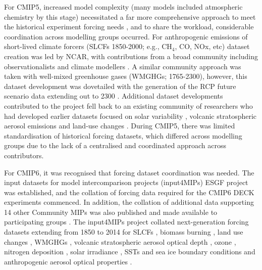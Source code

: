\documentclass[gmd, preprint]{copernicus}
\begin{document}
For CMIP5, increased model complexity (many models included atmospheric chemistry by this stage) necessitated a far more comprehensive approach to meet the historical experiment forcing needs \citep[1850-2005;][]{taylor_overview_2012}, and to share the workload, considerable coordination across modelling groups occurred. For anthropogenic emissions of short-lived climate forcers (SLCFs 1850-2000; e.g., CH$_{4}$, CO, NOx, etc) dataset creation was led by NCAR, with contributions from a broad community including observationalists and climate modellers \citep{lamarque_historical_2010}. A similar community approach was taken with well-mixed greenhouse gases (WMGHGs; 1765-2300), however, this dataset development was dovetailed with the generation of the RCP future scenario data extending out to 2300 \citep{meinshausen_rcp_2011}. Additional dataset developments contributed to the project fell back to an existing community of researchers who had developed earlier datasets focused on solar variability \citep{frohlich_solar_2004}, volcanic stratospheric aerosol emissions \citep{stenchikov_arctic_2006} and land-use changes \citep{hurtt_underpinnings_2006}. During CMIP5, there was limited standardisation of historical forcing datasets, which differed across modelling groups due to the lack of a centralised and coordinated approach across contributors.

For CMIP6, it was recognised that forcing dataset coordination was needed. The input datasets for model intercomparison projects (input4MIPs) ESGF project was established, and the collation of forcing data required for the CMIP6 DECK experiments commenced. In addition, the collation of additional data supporting 14 other Community MIPs was also published and made available to participating groups \citep{durack_toward_2018}. The input4MIPs project collated next-generation forcing datasets extending from 1850 to 2014 for SLCFs \citep{hoesly_historical_2018,feng_generation_2020}, biomass burning \citep[e.g., fire;][]{van_marle_historic_2017}, land use changes \citep{hurtt_harmonization_2020,chini_land-use_2021}, WMGHGs \citep{meinshausen_historical_2017}, volcanic stratospheric aerosol optical depth \citep[e.g.,][]{aubry_new_2020,aubry_independent_2021,aubry_new_2023}, ozone \citep{checa-garcia_historical_2018}, nitrogen deposition \citep{hegglin_ccmi_2016}, solar irradiance \citep{matthes_solar_2017}, SSTs and sea ice boundary conditions \citep{durack_pcmdi_2018} and anthropogenic aerosol optical properties \citep[e.g.,][]{fiedler_anthropogenic_2019}.
\end{document}
